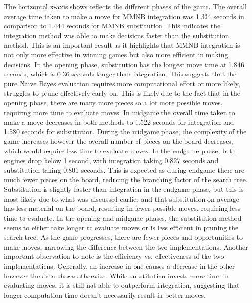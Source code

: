 The horizontal x-axis shows reflects the different phases of the game. The overall average time taken to make a move for MMNB integration was 1.334 seconds in comparison to 1.444 seconds for MMNB substitution. This indicates the integration method was able to make decisions faster than the substitution method. This is an important result as it highlights that MMNB integration is not only more effective in winning games but also more efficient in making decisions. In the opening phase, substitution has the longest move time at 1.846 seconds, which is 0.36 seconds longer than integration. This suggests that the pure Naive Bayes evaluation requires more computational effort or more likely, struggles to prune effectively early on. This is likely due to the fact that in the opening phase, there are many more pieces so a lot more possible moves, requiring more time to evaluate moves. In midgame the overall time taken to make a move decreases in both methods to 1.522 seconds for integration and 1.580 seconds for substitution. During the midgame phase, the complexity of the game increases however the overall number of pieces on the board decreases, which would require less time to evaluate moves. In the endgame phase, both engines drop below 1 second, with integration taking 0.827 seconds and substitution taking 0.801 seconds. This is expected as during endgame there are much fewer pieces on the board, reducing the branching factor of the search tree. Substitution is slightly faster than integration in the endgame phase,  but this is most likely due to what was discussed earlier and that substitution on average has less material on the board, resulting in fewer possible moves, requiring less time to evaluate. In the opening and midgame phases, the substitution method seems to either take longer to evaluate moves or is less efficient in pruning the search tree. As the game progresses, there are fewer pieces and opportunities to make moves, narrowing the difference between the two implementations. Another important observation to note is the efficiency vs. effectiveness of the two implementations. Generally, an increase in one causes a decrease in the other however the data shows otherwise. While substitution invests more time in evaluating moves, it is still not able to outperform integration, suggesting that longer computation time doesn't necessarily result in better moves. 


